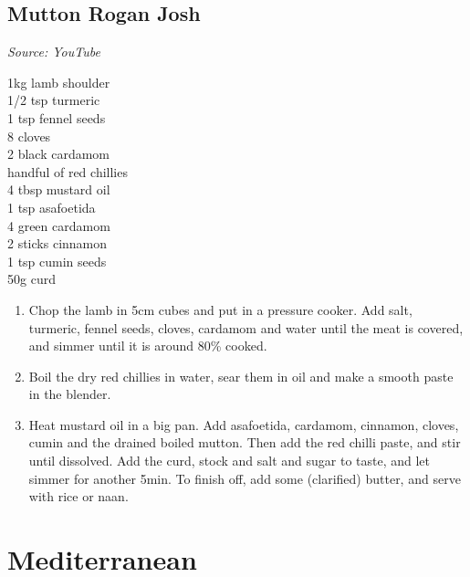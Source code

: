 \documentclass{report}
\begin{document}
\section{Mutton Rogan Josh}
\textit{Source: YouTube}\\
\begin{minipage}[t]{0.21\textwidth} \vspace{0pt}
1kg lamb shoulder\\
1/2 tsp turmeric\\
1 tsp fennel seeds\\
8 cloves\\
2 black cardamom\\
handful of red chillies\\
4 tbsp mustard oil\\
1 tsp asafoetida\\
4 green cardamom\\
2 sticks cinnamon\\
1 tsp cumin seeds\\
50g curd
\end{minipage}
\hfill
\begin{minipage}[t]{0.78\textwidth} \vspace{0pt}
	\begin{enumerate}
		\item Chop the lamb in 5cm cubes and put in a pressure cooker. Add salt, turmeric, fennel seeds, cloves, cardamom and water until the meat is covered, and simmer until it is around 80\% cooked.
		\item Boil the dry red chillies in water, sear them in oil and make a smooth paste in the blender.
		\item Heat mustard oil in a big pan. Add asafoetida, cardamom, cinnamon, cloves, cumin and the drained boiled mutton. Then add the red chilli paste, and stir until dissolved. Add the curd, stock and salt and sugar to taste, and let simmer for another 5min. To finish off, add some (clarified) butter, and serve with rice or naan.
	\end{enumerate}	
\end{minipage}

\chapter{Mediterranean}
\end{document}
